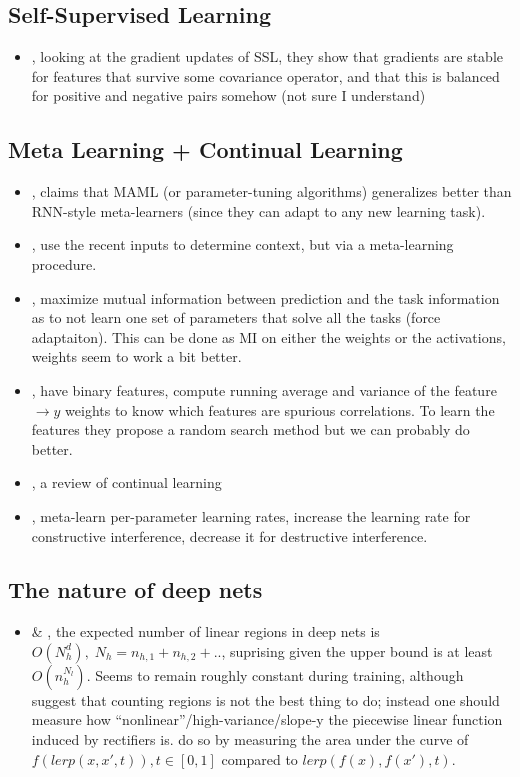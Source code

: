\subsection{Self-Supervised Learning}
\begin{itemize}
  \item \citet{tian2020understanding}, looking at the gradient updates of SSL, they show that gradients are stable for features that survive some covariance operator, and that this is balanced for positive and negative pairs somehow (not sure I understand)
\end{itemize}


\subsection{Meta Learning + Continual Learning}
\begin{itemize}
  \item \citet{finn2017metalearning}, claims that MAML (or parameter-tuning algorithms) generalizes better than RNN-style meta-learners (since they can adapt to any new learning task).
  \item \citet{he2019task}, use the recent inputs to determine context, but via a meta-learning procedure.
  \item \citet{Yin2020Meta-Learning}, maximize mutual information between prediction and the task information as to not learn one set of parameters that solve all the tasks (force adaptaiton). This can be done as MI on either the weights or the activations, weights seem to work a bit better.
  \item \citet{javed2020learning}, have binary features, compute running average and variance of the feature $\to y$ weights to know which features are spurious correlations. To learn the features they propose a random search method but we can probably do better.
  \item \citet{hadsell2020embracing}, a review of continual learning
  \item \citet{gupta2020maml}, meta-learn per-parameter learning rates, increase the learning rate for constructive interference, decrease it for destructive interference.
\end{itemize}

\subsection{The nature of deep nets}
\begin{itemize}
  \item \citet{hanin2019complexity} \& \citet{hanin2019deep}, the expected number of linear regions in deep nets is $O(N_h^d),\;N_h=n_{h,1}+n_{h,2}+..$,  suprising given the upper bound is at least $O(n_h^{N_l})$. Seems to remain roughly constant during training, although \citet{gamba2022all} suggest that counting regions is not the best thing to do; instead one should measure how ``nonlinear''/high-variance/slope-y the piecewise linear function induced by rectifiers is. \citet{gamba2022all} do so by measuring the area under the curve of $f(lerp(x, x', t)), t\in [0,1]$ compared to $lerp(f(x), f(x'), t)$.
\end{itemize}

